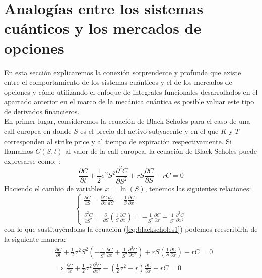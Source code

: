 \documentclass[11pt,a4paper]{article}
\begin{document}
\section{Analog\'ias entre los sistemas cu\'anticos y los mercados de opciones}

En esta secci\'on explicaremos la conexi\'on sorprendente y profunda que existe entre el comportamiento de los sistemas cu\'anticos y el de los mercados de opciones y c\'omo utilizando el enfoque de integrales funcionales desarrollados en el apartado anterior en el marco de la mec\'anica cu\'antica es posible valuar este tipo de derivados financieros. \\
En primer lugar, consideremos la ecuaci\'on de Black-Scholes para el caso de una call europea en donde $S$ es el precio del activo subyacente y en el que $K$ y $T$ corresponden  al strike price y al tiempo de expiraci\'on respectivamente. Si llamamos $C(S,t)$ al valor de la call europea, la ecuaci\'on de Black-Scholes puede expresarse como: \cite{black1973pricing, merton1973theory, maurette2023quantderivados, ziemann2021quantum}:
\begin{equation}
\frac{\partial C}{\partial t} +\frac{1}{2} \sigma ^2 S^2 \frac{\partial^2 C}{\partial S^2} + rS\frac{\partial C}{\partial S} - rC = 0
\label{eq:blackscholes1}
\end{equation}
Haciendo el cambio de variables $x = \ln(S)$, tenemos las siguientes relaciones:
\begin{equation}
\left\{
\begin{array}{l}
\frac{\partial C}{\partial S} = \frac{\partial C}{\partial x}\frac{dx}{dS} = \frac{1}{S}\frac{\partial C}{\partial x} \\ \\
\frac{\partial^2 C}{\partial S^2} = \frac{\partial}{\partial S}\left( \frac{1}{S} \frac{\partial C}{\partial x} \right) = - \frac{1}{S^2}\frac{\partial C}{\partial x} + \frac{1}{S^2}\frac{\partial^2 C}{\partial x^2}
\end{array}
\right.
\label{eq:changeofvariable}
\end{equation}
con lo que sustituy\'endolas la ecuaci\'on (\ref{eq:blackscholes1}) podemos reescribirla de la siguiente manera:
\begin{equation}
\begin{split}
& \frac{\partial C}{\partial t} + \frac{1}{2} \sigma^2 S^2 \left( - \frac{1}{S^2}\frac{\partial C}{\partial x} + \frac{1}{S^2}\frac{\partial^2 C}{\partial x^2} \right) + rS\left( \frac{1}{S}\frac{\partial C}{\partial x} \right) - rC = 0 \\
& \Rightarrow \frac{\partial C}{\partial t} + \frac{1}{2} \sigma^2 \frac{\partial^2 C}{\partial x^2} - \left( \frac{1}{2} \sigma^2 - r \right)\frac{\partial C}{\partial x} - rC = 0
\end{split}
\label{eq:blackscholes2}
\end{equation}
\end{document}
